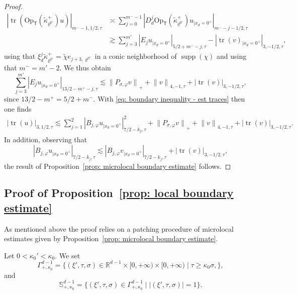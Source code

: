 \documentclass[JEP,XML,SOM,Unicode,published]{cedram}
\let\sep\mid
\theoremstyle{plain}
\theoremstyle{definition}
\def\R{\mathbb{R}}
\newcommand{\nhd}{neighborhood\xspace}
\let\k\kappa
\let\y\varrho
\newcommand{\tk}{\tilde{\kappa}}
\newcommand{\tchi}{\tilde{\chi}}
\newcommand{\br}{\ensuremath{_{|x_d=0^+}}}
\newcommand{\Opt}{\ensuremath{\mathrm{Op}_{\scriptscriptstyle{\mathsf{T}}}}}
\newcommand{\Norm}[2]{{\| #1 \|}_{#2}}
\newcommand{\Normsc}[2]{{\| #1 \|}_{#2, \tau}}
\newcommand{\normsc}[2]{{| #1 |}_{#2, \tau}}
\newcommand{\Pconj}{P_{\sigma,\varphi}}
\DeclareMathOperator{\supp}{supp}
\DeclareMathOperator{\trace}{tr}
\begin{document}
\begin{proof}
\begin{align*}
\normsc{\trace(\Opt(\tk^+_{\y^{0\prime}}) u)}{m^--1, 1/2}
& \asymp \sum_{j=0}^{m^--1}
\normsc{D_d^j \Opt(\tk^+_{\y^{0\prime}}) u\br}{m^--j- 1/2}\\[-5pt]
& \gtrsim \sum_{j=3}^{m'}
\normsc{E_j u\br}{5/2+ m^--j} - \normsc{\trace(v)\br}{3, - 1/2} ,
\end{align*}
using that $\xi_d^j \tk^+_{\y^{0\prime}} = \tchi e_{j+3,
\y^{0\prime}}$ in a conic \nhd of $\supp(\chi)$ and using that
$m^- = m'-2$.
We thus obtain\vspace*{-3pt}
\begin{equation*}
\sum_{j=3}^{m'} \normsc{E_{j}u\br}{13/2-m^+-j}
\lesssim
\Norm{\Pconj v}{+}
+ \Normsc{v}{4,-1}
+ \normsc{\trace(v)}{3,-1/2},
\end{equation*}
since $13/2-m^+ = 5/2+ m^-$.
With \eqref{eq: boundary inequality - est traces} then one finds\vspace*{-3pt}
\begin{align*}
\normsc{\trace(u)}{3,1/2}
\lesssim \sum _{j=1}^{2} \normsc{B_{j, \varphi}u\br}{7/2-k_{j}}^2
+ \Norm{\Pconj v}{+}
+ \Normsc{v}{4,-1} + \normsc{\trace(v)}{3,-1/2}.
\end{align*}
In addition, observing that
\begin{equation*}
\normsc{B_{j, \varphi}u\br}{7/2-k_{j}}\lesssim
\normsc{B_{j, \varphi}v\br}{7/2-k_{j}} + \normsc{\trace(v)}{3,-1/2},
\end{equation*}
the result of Proposition~\ref{prop: microlocal boundary estimate}
follows.
\end{proof}

\subsection{Proof of Proposition~\ref{prop: local boundary estimate}}
\label{sec: proof prop: local boundary estimate}
As mentioned above the proof relies on a patching procedure of
microlocal estimates given by Proposition~\ref{prop: microlocal
boundary estimate}.

Let $0 < \k_0' < \k_0$.
We set
\begin{equation*}
\Gamma^{d-1}_{+, \k_0} = \{ (\xi',\tau,\sigma)\in\R^{d-1}\times [0,+\infty) \times
[0,+\infty)\sep \tau \geq \k_0 \sigma, \},
\end{equation*}
and
\begin{equation*}
\mathbb{S}^{d-1}_{+, \k_0} = \{ (\xi',\tau,\sigma)\in
\Gamma^{d-1}_{+, \k_0} \sep |(\xi',\tau,\sigma)|=1\}.
\end{equation*}
\end{document}
